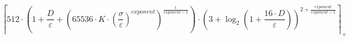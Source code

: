 \[\left\lceil 512 \cdot \left(1 + \frac{D}{\varepsilon} + \left(65536 \cdot K \cdot \left(\frac{\sigma}{\varepsilon}\right)^{exponent}\right)^{\frac{1}{exponent - 1}}\right) \cdot \left(3 + \log_{2}\left(1 + \frac{16 \cdot D}{\varepsilon}\right)\right)^{2 + \frac{exponent}{exponent - 1}} \right\rceil_{+}\]
